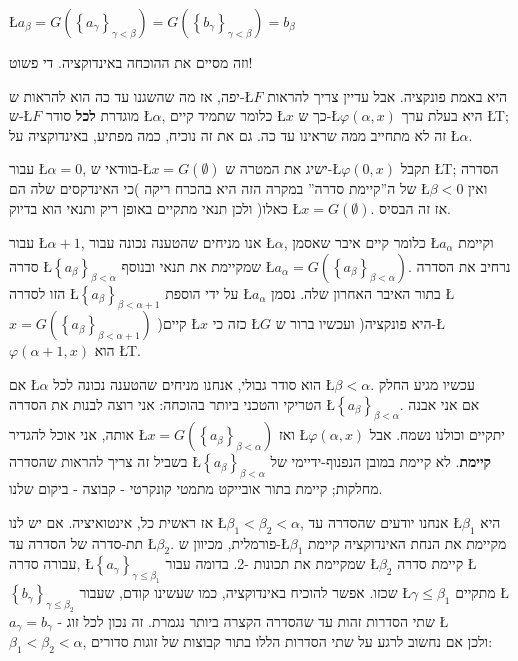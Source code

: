 \documentclass[english,hebrew]{article}
\begin{document}
\L{$a_{\beta}=G\left(\left\{ a_{\gamma}\right\} _{\gamma<\beta}\right)=G\left(\left\{ b_{\gamma}\right\} _{\gamma<\beta}\right)=b_{\beta}$}

וזה מסיים את ההוכחה באינדוקציה. די פשוט!

יפה, אז מה שהשגנו עד כה הוא להראות ש-\L{$F$} היא באמת פונקציה. אבל
עדיין צריך להראות ש-\L{$F$} מוגדרת \textbf{לכל} סודר \L{$\alpha$},
כלומר שתמיד קיים \L{$x$} כך ש-\L{$\varphi\left(\alpha,x\right)$}
היא בעלת ערך \L{T}; זה לא מתחייב ממה שראינו עד כה. גם את זה נוכיח,
כמה מפתיע, באינדוקציה על \L{$\alpha$}.

עבור \L{$\alpha=0$}, בוודאי ש-\L{$x=G\left(\emptyset\right)$} ישיג
את המטרה ש-\L{$\varphi\left(0,x\right)$} תקבל \L{T}; הסדרה של ה\textquotedblright קיימת
סדרה\textquotedblright{} במקרה הזה היא בהכרח ריקה )כי האינדקסים שלה
הם \L{$\beta<0$} ואין כאלו( ולכן תנאי {\endL} מתקיים באופן
ריק ותנאי {\endL} הוא בדיוק \L{$x=G\left(\emptyset\right)$}.
אז זה הבסיס.

עבור \L{$\alpha+1$}, אנו מניחים שהטענה נכונה עבור \L{$\alpha$},
כלומר קיים איבר שאסמן \L{$a_{\alpha}$} וקיימת סדרה \L{$\left\{ a_{\beta}\right\} _{\beta<\alpha}$}
שמקיימת את תנאי {\endL} ובנוסף \L{$a_{\alpha}=G\left(\left\{ a_{\beta}\right\} _{\beta<\alpha}\right)$}.
נרחיב את הסדרה הזו לסדרה \L{$\left\{ a_{\beta}\right\} _{\beta<\alpha+1}$}
על ידי הוספת \L{$a_{\alpha}$} בתור האיבר האחרון שלה. נסמן \L{$x=G\left(\left\{ a_{\beta}\right\} _{\beta<\alpha+1}\right)$}
)קיים \L{$x$} כזה כי \L{$G$} היא פונקציה( ועכשיו ברור ש-\L{$\varphi\left(\alpha+1,x\right)$}
הוא \L{T}.

אם \L{$\alpha$} הוא סודר גבולי, אנחנו מניחים שהטענה נכונה לכל \L{$\beta<\alpha$}.
עכשיו מגיע החלק הטריקי והטכני ביותר בהוכחה: אני רוצה לבנות את הסדרה
\L{$\left\{ a_{\beta}\right\} _{\beta<\alpha}$}. אם אני אבנה אותה,
אני אוכל להגדיר \L{$x=G\left(\left\{ a_{\beta}\right\} _{\beta<\alpha}\right)$}
ואז \L{$\varphi\left(\alpha,x\right)$} יתקיים וכולנו נשמח. אבל בשביל
זה צריך להראות שהסדרה \L{$\left\{ a_{\beta}\right\} _{\beta<\alpha}$}
\textbf{קיימת}. לא קיימת במובן הנפנוף-ידיימי של מחלקות; קיימת בתור
אובייקט מתמטי קונקרטי - קבוצה - ביקום שלנו.

אז ראשית כל, אינטואיציה. אם יש לנו \L{$\beta_{1}<\beta_{2}<\alpha$},
אנחנו יודעים שהסדרה עד \L{$\beta_{1}$} היא תת-סדרה של הסדרה עד \L{$\beta_{2}$}.
פורמלית, מכיוון ש-\L{$\beta_{1}$} מקיימת את הנחת האינדוקציה קיימת
עבורה סדרה, \L{$\left\{ a_{\gamma}\right\} _{\gamma\le\beta_{1}}$}
שמקיימת את תכונות {-2\endL}. בדומה עבור \L{$\beta_{2}$}
קיימת סדרה \L{$\left\{ b_{\gamma}\right\} _{\gamma\le\beta_{2}}$}
שכזו. אפשר להוכיח באינדוקציה, כמו שעשינו קודם, שעבור \L{$\gamma\le\beta_{1}$}
מתקיים \L{$a_{\gamma}=b_{\gamma}$} - שתי הסדרות זהות עד שהסדרה הקצרה
ביותר נגמרת. זה נכון לכל זוג \L{$\beta_{1}<\beta_{2}<\alpha$}, ולכן
אם נחשוב לרגע על שתי הסדרות הללו בתור קבוצות של זוגות סדורים:
\end{document}
